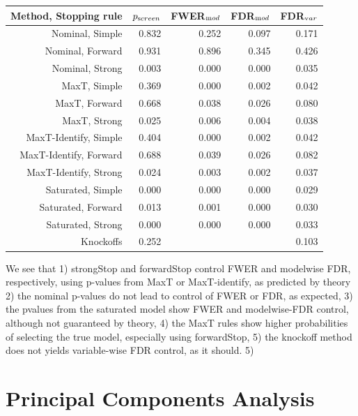 \documentclass{article}
\begin{document}
\begin{table}[ht]
\centering
\begin{tabular}{rrrrr}
  \hline
  Method, Stopping rule& $p_{\text screen}$ & FWER$_{\text mod}$ & FDR$_{\text mod}$ &FDR$_{\text var}$ \\
  \hline
Nominal, Simple & 0.832 & 0.252 & 0.097 & 0.171 \\ 
  Nominal, Forward & 0.931 & 0.896 & 0.345 & 0.426 \\ 
  Nominal, Strong & 0.003 & 0.000 & 0.000 & 0.035 \\ 
  \hline
  MaxT, Simple & 0.369 & 0.000 & 0.002 & 0.042 \\ 
  MaxT, Forward & 0.668 & 0.038 & 0.026 & 0.080 \\ 
  MaxT, Strong & 0.025 & 0.006 & 0.004 & 0.038 \\ 
  \hline
  MaxT-Identify, Simple & 0.404 & 0.000 & 0.002 & 0.042 \\ 
  MaxT-Identify, Forward & 0.688 & 0.039 & 0.026 & 0.082 \\ 
  MaxT-Identify, Strong & 0.024 & 0.003 & 0.002 & 0.037 \\ 
  \hline
  Saturated, Simple & 0.000 & 0.000 & 0.000 & 0.029 \\ 
  Saturated, Forward & 0.013 & 0.001 & 0.000 & 0.030 \\ 
  Saturated, Strong & 0.000 & 0.000 & 0.000 & 0.033 \\ 
  \hline
  Knockoffs & 0.252 &  &  & 0.103 \\ 
   \hline
\end{tabular}
\end{table}

We see that 1) strongStop and forwardStop control FWER and modelwise FDR, respectively, using p-values from MaxT or MaxT-identify, as predicted by theory
2) the nominal p-values do not lead to control of FWER or FDR, as expected, 3) the pvalues from the saturated model show FWER and modelwise-FDR control,
although not guaranteed by theory, 4) the MaxT rules show higher probabilities of selecting the true model, especially using forwardStop, 5) the knockoff method
does not yields variable-wise FDR control, as it should.
5)
\section{Principal Components Analysis}
\label{sec:pca}
\end{document}
